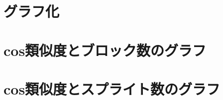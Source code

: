 \documentclass[a4paper,10pt,onecolumn,oneside,openany]{jsbook}
\begin{document}
\section{グラフ化}
\section{cos類似度とブロック数のグラフ}
\section{cos類似度とスプライト数のグラフ}









\end{document}
